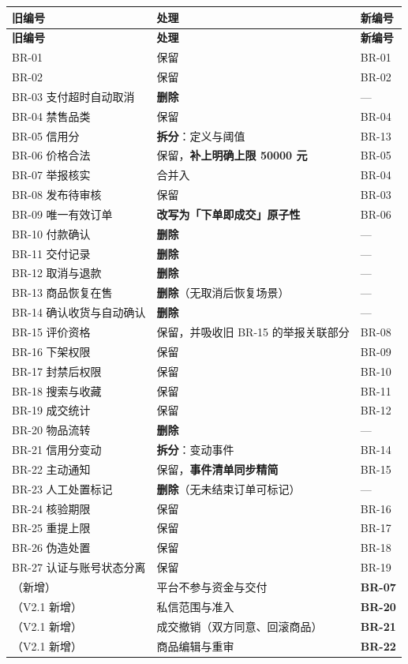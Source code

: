 \documentclass[12pt,a4paper]{ctexart}
\begin{document}
{\scriptsize
\begin{longtable}{|p{5.97cm}|p{7.83cm}|p{2.20cm}|}
\hline
\textbf{旧编号} & \textbf{处理} & \textbf{新编号} \\
\hline
\endfirsthead
\hline
\textbf{旧编号} & \textbf{处理} & \textbf{新编号} \\
\hline
\endhead
\hline
\endfoot
BR-01 & 保留 & BR-01 \\
\hline
BR-02 & 保留 & BR-02 \\
\hline
BR-03 支付超时自动取消 & \textbf{删除} & — \\
\hline
BR-04 禁售品类 & 保留 & BR-04 \\
\hline
BR-05 信用分 & \textbf{拆分}：定义与阈值 & BR-13 \\
\hline
BR-06 价格合法 & 保留，\textbf{补上明确上限 50000 元} & BR-05 \\
\hline
BR-07 举报核实 & 合并入 & BR-04 \\
\hline
BR-08 发布待审核 & 保留 & BR-03 \\
\hline
BR-09 唯一有效订单 & \textbf{改写为「下单即成交」原子性} & BR-06 \\
\hline
BR-10 付款确认 & \textbf{删除} & — \\
\hline
BR-11 交付记录 & \textbf{删除} & — \\
\hline
BR-12 取消与退款 & \textbf{删除} & — \\
\hline
BR-13 商品恢复在售 & \textbf{删除}（无取消后恢复场景） & — \\
\hline
BR-14 确认收货与自动确认 & \textbf{删除} & — \\
\hline
BR-15 评价资格 & 保留，并吸收旧 BR-15 的举报关联部分 & BR-08 \\
\hline
BR-16 下架权限 & 保留 & BR-09 \\
\hline
BR-17 封禁后权限 & 保留 & BR-10 \\
\hline
BR-18 搜索与收藏 & 保留 & BR-11 \\
\hline
BR-19 成交统计 & 保留 & BR-12 \\
\hline
BR-20 物品流转 & \textbf{删除} & — \\
\hline
BR-21 信用分变动 & \textbf{拆分}：变动事件 & BR-14 \\
\hline
BR-22 主动通知 & 保留，\textbf{事件清单同步精简} & BR-15 \\
\hline
BR-23 人工处置标记 & \textbf{删除}（无未结束订单可标记） & — \\
\hline
BR-24 核验期限 & 保留 & BR-16 \\
\hline
BR-25 重提上限 & 保留 & BR-17 \\
\hline
BR-26 伪造处置 & 保留 & BR-18 \\
\hline
BR-27 认证与账号状态分离 & 保留 & BR-19 \\
\hline
（新增） & 平台不参与资金与交付 & \textbf{BR-07} \\
\hline
（V2.1 新增） & 私信范围与准入 & \textbf{BR-20} \\
\hline
（V2.1 新增） & 成交撤销（双方同意、回滚商品） & \textbf{BR-21} \\
\hline
（V2.1 新增） & 商品编辑与重审 & \textbf{BR-22} \\
\hline
\end{longtable}
}
\end{document}
